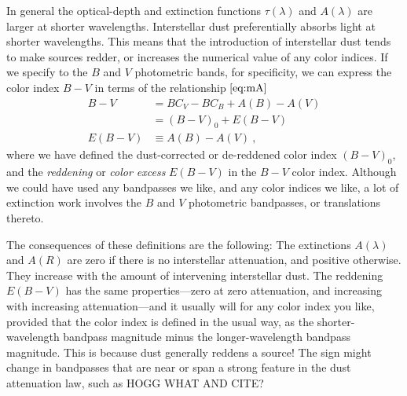 \documentclass[10pt]{article}
\begin{document}
In general the optical-depth and extinction functions $\tau(\lambda)$ and $A(\lambda)$ are larger at shorter wavelengths.
Interstellar dust preferentially absorbs light at shorter wavelengths.
This means that the introduction of interstellar dust tends to make sources redder, or increases the numerical value of any color indices.
If we specify to the $B$ and $V$ photometric bands, for specificity, we can express the color index $B-V$ in terms of the relationship $\eqref{eq:mA}$
\begin{align}
    B - V &= BC_V - BC_B + A(B) - A(V)\\
          &= (B - V)_0 + E(B - V)\\
    E(B - V) &\equiv A(B) - A(V) ~,
\end{align}
where we have defined the dust-corrected or de-reddened color index $(B-V)_0$,
and the \emph{reddening} or \emph{color excess} $E(B-V)$ in the $B-V$ color index.
Although we could have used any bandpasses we like, and any color indices we like,
a lot of extinction work involves the $B$ and $V$ photometric bandpasses, or translations thereto.

The consequences of these definitions are the following:
The extinctions $A(\lambda)$ and $A(R)$ are zero if there is no interstellar attenuation, and positive otherwise.
They increase with the amount of intervening interstellar dust.
The reddening $E(B-V)$ has the same properties---zero at zero attenuation, and increasing with increasing attenuation---and it usually will for any color index you like, provided that the color index is defined in the usual way, as the shorter-wavelength bandpass magnitude minus the longer-wavelength bandpass magnitude.
This is because dust generally reddens a source!
The sign might change in bandpasses that are near or span a strong feature in the dust attenuation law, such as HOGG WHAT AND CITE?
\end{document}

